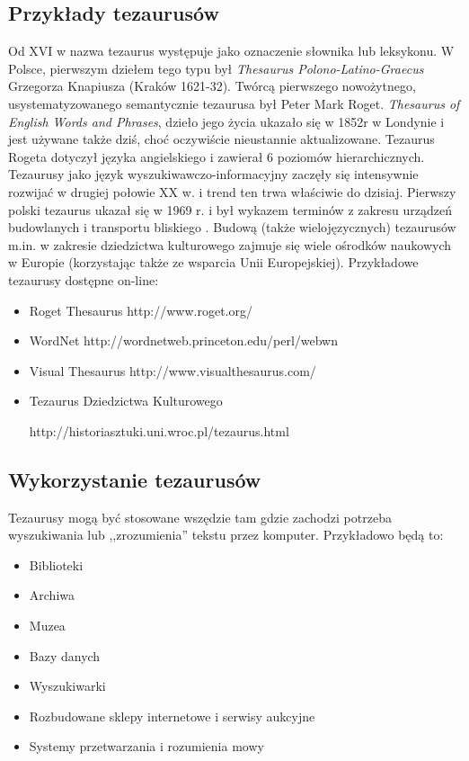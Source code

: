 \documentclass[12pt,a4paper,notitlepage]{article}
\begin{document}
\subsection{Przykłady tezaurusów}
Od XVI w nazwa tezaurus występuje jako oznaczenie słownika lub leksykonu. W Polsce, pierwszym dziełem tego typu był \textit{ Thesaurus Polono-Latino-Graecus} Grzegorza Knapiusza (Kraków 1621-32). Twórcą pierwszego nowożytnego, usystematyzowanego semantycznie tezaurusa był Peter Mark Roget. \textit{Thesaurus of English Words and Phrases}, dzieło jego życia ukazało się w 1852r w Londynie i jest używane także dziś, choć oczywiście nieustannie aktualizowane. Tezaurus Rogeta dotyczył języka angielskiego i zawierał 6 poziomów hierarchicznych. Tezaurusy jako język wyszukiwawczo-informacyjny zaczęły się intensywnie rozwijać w drugiej połowie XX w. i trend ten trwa właściwie do dzisiaj. Pierwszy polski tezaurus ukazał się w 1969 r. i był wykazem terminów z zakresu urządzeń budowlanych i transportu bliskiego \cite{Sosinska}. Budową (także wielojęzycznych) tezaurusów m.in. w zakresie dziedzictwa kulturowego zajmuje się wiele ośrodków naukowych w Europie (korzystając także ze wsparcia Unii Europejskiej).
Przykładowe tezaurusy dostępne on-line:
\begin{itemize}
    \item Roget Thesaurus http://www.roget.org/
	\item WordNet http://wordnetweb.princeton.edu/perl/webwn
	\item Visual Thesaurus http://www.visualthesaurus.com/
	\item Tezaurus Dziedzictwa Kulturowego 

http://historiasztuki.uni.wroc.pl/tezaurus.html
\end{itemize}  

\subsection{Wykorzystanie tezaurusów}
Tezaurusy mogą być stosowane wszędzie tam gdzie zachodzi potrzeba wyszukiwania lub ,,zrozumienia'' tekstu przez komputer. Przykładowo będą to: 
\begin{itemize}
   \item Biblioteki
	\item Archiwa
	\item Muzea
	\item Bazy danych
	\item Wyszukiwarki
	\item Rozbudowane sklepy internetowe i serwisy aukcyjne
	\item Systemy przetwarzania i rozumienia mowy
\end{itemize}
\end{document}
